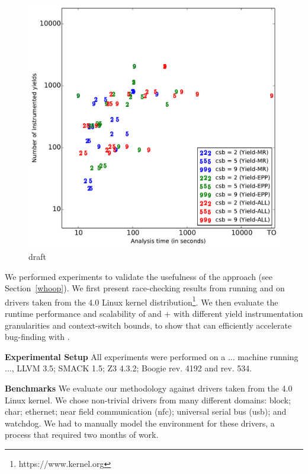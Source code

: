\begin{figure}
\centering
\includegraphics[width=.99\linewidth]{experiments/figures/correlation.pdf}
\caption{draft}
\label{fig:plot2}
\end{figure}

We performed experiments to validate the usefulness of the \whoop approach (see Section~\ref{whoop}). We first present race-checking results from running \whoop and \corral on \sizeOfBenchmarks drivers taken from the 4.0 Linux kernel distribution\footnote{https://www.kernel.org}. We then evaluate the runtime performance and scalability of \corral and \whoop + \corral with different yield instrumentation granularities and context-switch bounds, to show that \whoop can efficiently accelerate bug-finding with \corral.

\noindent
\textbf{Experimental Setup}\xspace\xspace All experiments were performed on a ... machine running ..., LLVM 3.5; SMACK 1.5; Z3 4.3.2; Boogie rev. 4192 and \corral rev. 534.

\noindent
\textbf{Benchmarks}\xspace\xspace We evaluate our methodology against \sizeOfBenchmarks drivers taken from the 4.0 Linux kernel. We chose non-trivial drivers from many different domains: block; char; ethernet; near field communication (nfc); universal serial bus (usb); and watchdog. We had to manually model the environment for these drivers, a process that required two months of work.

